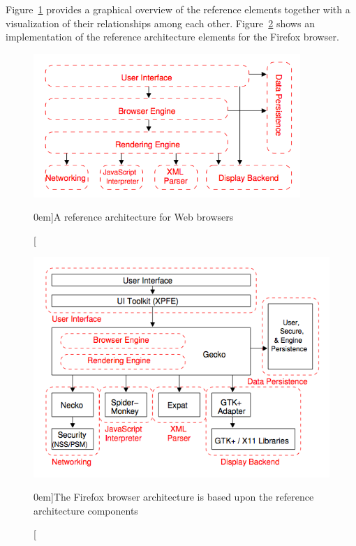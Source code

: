 \documentclass[a4paper, justified, notoc]{tufte-handout} %
\begin{document}
Figure~\ref{fig:reference_architecture} provides a graphical overview of the reference elements together with a visualization of their relationships among each other. Figure~\ref{fig:mozilla_architecture} shows an implementation of the reference architecture elements for the Firefox browser.


\begin{figure}%
	\centering
  \includegraphics[width=0.9\textwidth]{./figures/browser_reference_architecture.png}
  \caption[][0em]{A reference architecture for Web browsers~\citep{grosskurth:2006}}
  \label{fig:reference_architecture}
\end{figure}

\begin{figure}%
	\centering
  \includegraphics[width=1.0\textwidth]{./figures/mozilla_browser_architecture.png}
  \caption[][0em]{The Firefox browser architecture is based upon the reference architecture components~\citep{grosskurth:2006}}
  \label{fig:mozilla_architecture}
\end{figure}
\end{document}
